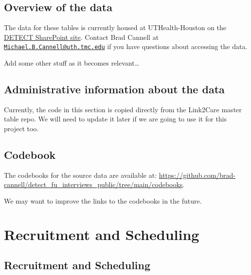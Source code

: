\documentclass[
  letterpaper,
  DIV=11,
  numbers=noendperiod]{scrreprt}
\begin{document}

\hypertarget{overview-of-the-data}{%
\chapter{Overview of the data}\label{overview-of-the-data}}

The data for these tables is currently housed at UTHealth-Houston on the
\href{https://uthtmc.sharepoint.com/sites/SPHDETECT-RPC/SitePages/Home.aspx}{DETECT
SharePoint site}. Contact Brad Cannell at
\href{mailto:Michael.B.Cannell@uth.tmc.edu}{\nolinkurl{Michael.B.Cannell@uth.tmc.edu}}
if you have questions about accessing the data.

Add some other stuff as it becomes relevant\ldots{}


\hypertarget{administrative-information-about-the-data}{%
\chapter{Administrative information about the
data}\label{administrative-information-about-the-data}}

Currently, the code in this section is copied directly from the
Link2Care master table repo. We will need to update it later if we are
going to use it for this project too.


\hypertarget{codebook}{%
\chapter{Codebook}\label{codebook}}

The codebooks for the source data are available at:
\url{https://github.com/brad-cannell/detect_fu_interviews_public/tree/main/codebooks}.

We may want to improve the links to the codebooks in the future.

\part{Recruitment and Scheduling}

\hypertarget{recruitment-and-scheduling-1}{%
\chapter{Recruitment and
Scheduling}\label{recruitment-and-scheduling-1}}
\end{document}
